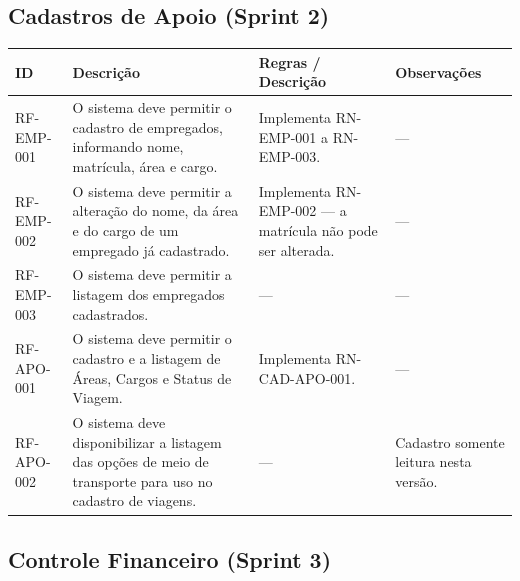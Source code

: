\documentclass[12pt,article,oneside,a4paper]{abntex2}
\begin{document}
\bigskip

\subsection{Cadastros de Apoio (Sprint 2)}

\begin{xltabular}{\textwidth}{|l|Y|Y|Y|}
\hline
{}
\textbf{ID} & \textbf{Descrição} & \textbf{Regras / Descrição} & \textbf{Observações} \\
\hline
\endhead
RF-EMP-001 & O sistema deve permitir o cadastro de empregados, informando nome, matrícula, área e cargo. & Implementa RN-EMP-001 a RN-EMP-003. & --- \\
\hline
RF-EMP-002 & O sistema deve permitir a alteração do nome, da área e do cargo de um empregado já cadastrado. & Implementa RN-EMP-002 --- a matrícula não pode ser alterada. & --- \\
\hline
RF-EMP-003 & O sistema deve permitir a listagem dos empregados cadastrados. & --- & --- \\
\hline
RF-APO-001 & O sistema deve permitir o cadastro e a listagem de Áreas, Cargos e Status de Viagem. & Implementa RN-CAD-APO-001. & --- \\
\hline
RF-APO-002 & O sistema deve disponibilizar a listagem das opções de meio de transporte para uso no cadastro de viagens. & --- & Cadastro somente leitura nesta versão. \\
\hline
\end{xltabular}

\bigskip

\subsection{Controle Financeiro (Sprint 3)}
\end{document}
